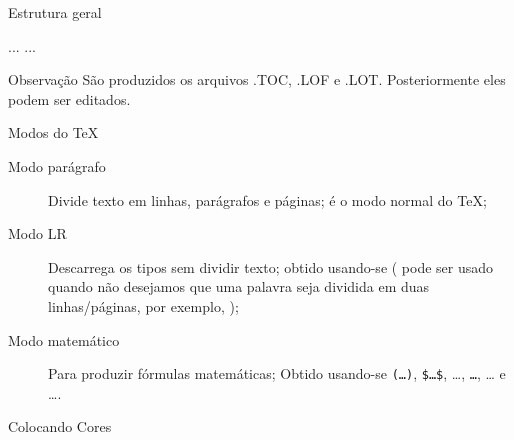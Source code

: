 \begin{frame}{Estrutura geral}
\begin{LaTeXcode}
\n
...\n
{}\n
{}\n
{}\n
{}\n
{}\n
{}\n
...\n
{}
\end{LaTeXcode}

\begin{block}{Observação}
São produzidos os arquivos .TOC, .LOF e .LOT. Posteriormente eles podem ser editados.
\end{block}
\end{frame}

\begin{frame}{Modos do \TeX}
\begin{description}
\item [Modo parágrafo] Divide texto em linhas, parágrafos e páginas; é o modo normal do \TeX;
\item [Modo LR] Descarrega os tipos sem dividir texto; obtido usando-se  ( pode ser usado quando não desejamos que uma palavra seja dividida em duas linhas/páginas, por exemplo, );
\item [Modo matemático] Para produzir fórmulas matemáticas; Obtido usando-se \texttt{\bs(\dots\bs)}, \texttt{\$\dots\$}, \dots{}, \texttt{\bs\ls\dots\bs\rs}, \dots {} e \dots {}.
\end{description}
\end{frame}

\begin{frame}{Colocando Cores}
\end{frame}

